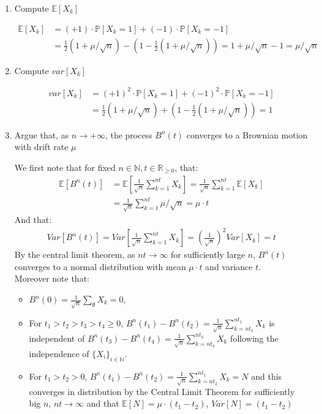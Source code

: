 \documentclass[12pt,twoside, letter]{exam}
\theoremstyle{definition}
\newcommand{\nn}{\mathbb{N}}
\newcommand{\rr}{\mathbb{R}}
\newcommand{\ee}{\mathbb{E}}
\newcommand{\pp}{\mathbb{P}}
\begin{document}
    \begin{enumerate}
      \item Compute $\ee[X_k]$
        \begin{solution}
          \begin{align*}
            \ee[X_k] &= (+1) \cdot \pp[X_k = 1] + (-1) \cdot \pp[X_k = -1] \\
            &= \frac{1}{2}(1+\mu/\sqrt{n}) - (1 - \frac{1}{2}(1+\mu/\sqrt{n})) = 1 + \mu/\sqrt{n} - 1 = \mu/\sqrt{n}
          \end{align*}
        \end{solution}
      \item Compute $var[X_k]$
        \begin{solution}
          \begin{align*}
            var[X_k] &= (+1)^2 \cdot \pp[X_k = 1] + (-1)^2 \cdot \pp[X_k = -1] \\
            &= \frac{1}{2}(1+\mu/\sqrt{n}) + (1 - \frac{1}{2}(1+\mu/\sqrt{n})) = 1
          \end{align*}
        \end{solution}
      \item Argue that, as $n \rightarrow +\infty$, the process $B^n(t)$ converges to a Brownian motion with drift rate $\mu$
      \begin{solution}
        We first note that for fixed $n \in \nn, t \in \rr_{\geq0}$, that:
        \begin{align*}
          \ee[B^n(t)] &= \ee[\frac{1}{\sqrt{n}} \sum^{nt}_{k=1} X_k] = \frac{1}{\sqrt{n}} \sum^{nt}_{k=1} \ee[X_k] \\
          &= \frac{1}{\sqrt{n}} \sum^{nt}_{k=1} \mu/\sqrt{n} = \mu \cdot t
        \end{align*}
        And that:
        \begin{align*}
          Var[B^n(t)] = Var[\frac{1}{\sqrt{n}} \sum^{nt}_{k=1} X_k] = (\frac{1}{\sqrt{n}})^2 Var[X_k] = t
        \end{align*}
        By the central limit theorem, as $nt \rightarrow \infty$ for sufficiently large $n$,
        $B^n(t)$ converges to a normal distribution with mean $\mu \cdot t$ and variance $t$. \\
        Moreover note that:
          \begin{itemize}
            \item $B^n(0) = \frac{1}{\sqrt{n}} \sum_{\emptyset} X_k = 0$,
            \item For $t_1 > t_2 > t_3 > t_4 \geq 0$, $B^n(t_1) - B^n(t_2) = \frac{1}{\sqrt{n}} \sum^{nt_1}_{k = nt_2} X_k$ is independent
            of $B^n(t_3) - B^n(t_4) = \frac{1}{\sqrt{n}} \sum^{nt_3}_{k = nt_4} X_k$ following the independence of $\{X_i\}_{i \in \nn}$.
            \item For $t_1 > t_2 > 0$, $B^n(t_1) - B^n(t_2) = \frac{1}{\sqrt{n}} \sum^{nt_1}_{k = nt_2} X_k = N$ and this converges in distribution
              by the Central Limit Theorem for sufficiently big $n$, $nt \rightarrow \infty$ and that $\ee[N] = \mu \cdot (t_1 - t_2)$, $Var[N] =(t_1 - t_2)$
          \end{itemize}
      \end{solution}
    \end{enumerate}
\end{document}
